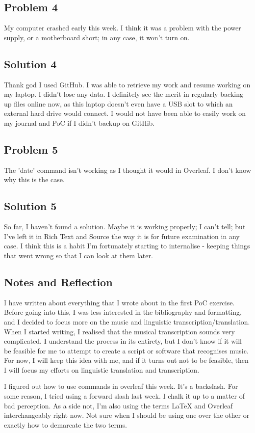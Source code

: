 \documentclass{article}
\begin{document}
\subsection{Problem 4}
My computer crashed early this week. I think it was a problem with the power supply, or a motherboard short; in any case, it won't turn on.
\subsection{Solution 4}
Thank god I used GitHub. I was able to retrieve my work and resume working on my laptop. I didn't lose any data. I definitely see the merit in regularly backing up files online now, as this laptop doesn't even have a USB slot to which an external hard drive would connect. I would not have been able to easily work on my journal and PoC if I didn't backup on GitHib.
\subsection{Problem 5}
The 'date' command isn't working as I thought it would in Overleaf. I don't know why this is the case.
\subsection{Solution 5}
So far, I haven't found a solution. Maybe it is working properly; I can't tell; but I've left it in Rich Text and Source the way it is for future examination in any case. I think this is a habit I'm fortunately starting to internalise - keeping things that went wrong so that I can look at them later.
\subsection{Notes and Reflection}
I have written about everything that I wrote about in the first PoC exercise. Before going into this, I was less interested in the bibliography and formatting, and I decided to focus more on the music and linguistic transcription/translation. When I started writing, I realised that the musical transcription sounds very complicated. I understand the process in its entirety, but I don’t know if it will be feasible for me to attempt to create a script or software that recognises music. For now, I will keep this idea with me, and if it turns out not to be feasible, then I will focus my efforts on linguistic translation and transcription.

I figured out how to use commands in overleaf this week. It's a backslash. For some reason, I tried using a forward slash last week. I chalk it up to a matter of bad perception. As a side not, I'm also using the terms LaTeX and Overleaf interchangeably right now. Not sure when I should be using one over the other or exactly how to demarcate the two terms.
\end{document}
